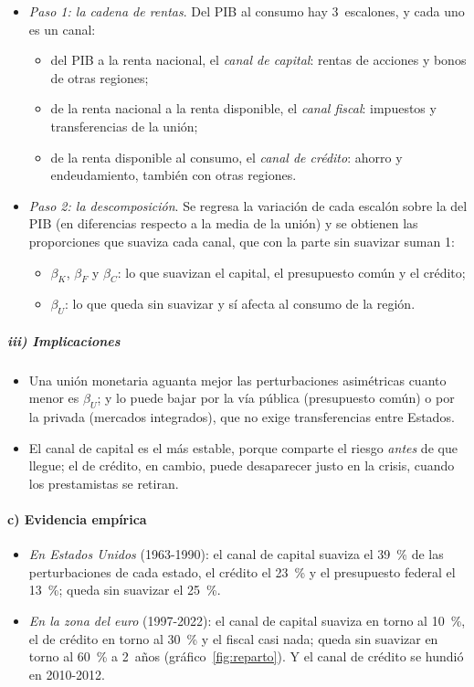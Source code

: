 \documentclass[11pt]{article}
\begin{document}
\begin{itemize}
\item \emph{Paso 1: la cadena de rentas}. Del PIB al consumo hay 3~escalones, y cada uno es un canal:
  \begin{itemize}
  \item del PIB a la renta nacional, el \emph{canal de capital}: rentas de acciones y bonos de otras regiones;
  \item de la renta nacional a la renta disponible, el \emph{canal fiscal}: impuestos y transferencias de la unión;
  \item de la renta disponible al consumo, el \emph{canal de crédito}: ahorro y endeudamiento, también con otras regiones.
  \end{itemize}
\item \emph{Paso 2: la descomposición}. Se regresa la variación de cada escalón sobre la del PIB (en diferencias respecto a la media de la unión) y se obtienen las proporciones que suaviza cada canal, que con la parte sin suavizar suman 1:
  \begin{itemize}
  \item $\beta_K$, $\beta_F$ y $\beta_C$: lo que suavizan el capital, el presupuesto común y el crédito;
  \item $\beta_U$: lo que queda sin suavizar y sí afecta al consumo de la región.
  \end{itemize}
\end{itemize}

\subparagraph{iii) Implicaciones}

\begin{itemize}
\item Una unión monetaria aguanta mejor las perturbaciones asimétricas cuanto menor es $\beta_U$; y lo puede bajar por la vía pública (presupuesto común) o por la privada (mercados integrados), que no exige transferencias entre Estados.
\item El canal de capital es el más estable, porque comparte el riesgo \emph{antes} de que llegue; el de crédito, en cambio, puede desaparecer justo en la crisis, cuando los prestamistas se retiran.
\end{itemize}

\paragraph{c) Evidencia empírica}

\begin{itemize}
\item \emph{En Estados Unidos} (1963-1990): el canal de capital suaviza el 39~\% de las perturbaciones de cada estado, el crédito el 23~\% y el presupuesto federal el 13~\%; queda sin suavizar el 25~\%\nocite{AsdrubaliSorensenYosha1996Channels}.
\item \emph{En la zona del euro} (1997-2022): el canal de capital suaviza en torno al 10~\%, el de crédito en torno al 30~\% y el fiscal casi nada; queda sin suavizar en torno al 60~\% a 2~años (gráfico~\ref{fig:reparto})\nocite{Cimadomo2022RiskSharing}. Y el canal de crédito se hundió en 2010-2012.
\end{itemize}
\end{document}
